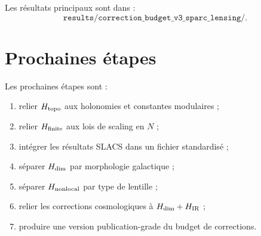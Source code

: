 \documentclass[11pt,a4paper]{article}
\begin{document}
Les résultats principaux sont dans :
\[
\texttt{results/correction\_budget\_v3\_sparc\_lensing/}.
\]

\appendix

\section{Prochaines étapes}

Les prochaines étapes sont :

\begin{enumerate}
    \item relier \(H_{\rm topo}\) aux holonomies et constantes modulaires ;
    \item relier \(H_{\rm finite}\) aux lois de scaling en \(N\) ;
    \item intégrer les résultats SLACS dans un fichier standardisé ;
    \item séparer \(H_{\rm dim}\) par morphologie galactique ;
    \item séparer \(H_{\rm nonlocal}\) par type de lentille ;
    \item relier les corrections cosmologiques à \(H_{\rm dim}+H_{\rm IR}\) ;
    \item produire une version publication-grade du budget de corrections.
\end{enumerate}
\end{document}
